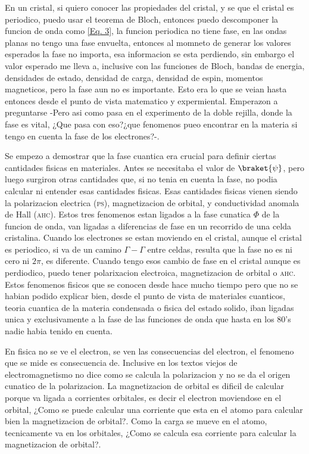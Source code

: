 \documentclass[11pt,fleqn]{book}
\begin{document}
En un cristal, si quiero conocer las propiedades del cristal, y se que el cristal es periodico, puedo usar el teorema de Bloch, entonces puedo descomponer la funcion de onda como \ref{Eq. 3}, la funcion periodica no tiene fase, en las ondas planas no tengo una fase envuelta, entonces al momneto de generar los valores esperados la fase no importa, esa informacion se esta perdiendo, sin embargo el valor esperado me lleva a, inclusive con las funciones de Bloch, bandas de energia, densidades de estado, densidad de carga, densidad de espin, momentos magneticos, pero la fase aun no es importante. Esto era lo que se veian hasta entonces desde el punto de vista matematico y expermiental. Emperazon a preguntarse -Pero asi como pasa en el experimento de la doble rejilla, donde la fase es vital, ¿Que pasa con eso?¿que fenomenos pueo encontrar en la materia si tengo en cuenta la fase de los electrones?-.

Se empezo a demostrar que la fase cuantica era crucial para definir ciertas cantidades fisicas en materiales. Antes se necesitaba el valor de $\braket{\psi}$, pero luego surgiron otras cantidades que, si no tenia en cuenta la fase, no podia calcular ni entender esas cantidades fisicas. Esas cantidades fisicas vienen siendo la polarizacion electrica (\textsc{ps}), magnetizacion de orbital, y conductividad anomala de Hall (\textsc{ahc}). Estos tres fenomenos estan ligados a la fase cunatica $\Phi$ de la funcion de onda, van ligadas a diferencias de fase en un recorrido de una celda cristalina. Cuando los  electrones se estan moviendo en el cristal, aunque el cristal es periodico, si va de un camino $\Gamma-\Gamma$ entre celdas, resulta que la fase no es ni cero ni $2\pi$, es diferente. Cuando tengo esos cambio de fase en el cristal aunque es perdiodico, puedo tener polarixacion electroica, magnetizacion de orbital o \textsc{ahc}. Estos fenomenos fisicos que se conocen desde hace mucho tiempo pero que no se habian podido explicar bien, desde el punto de vista de materiales cuanticos, teoria  cuantica de la materia condensada o fisica del estado solido, iban ligadas unica y exclusivamente a la fase de las funciones de onda que hasta en los 80's nadie habia tenido en cuenta.

En fisica no se ve el electron, se ven las consecuencias del electron, el fenomeno que se mide es consecuencia de. Inclusive en los textos viejos de electromagnetismo no dice como se calcula la polarizacion y no se da el origen cunatico de la polarizacion. La magnetizacion de orbital es dificil de calcular porque va ligada a corrientes orbitales, es decir el electron moviendose en el orbital, ¿Como se puede calcular una corriente que esta en el atomo para calcular bien la magnetizacion de orbital?. Como la carga se mueve en el atomo, tecnicamente va en los orbitales, ¿Como se calcula esa corriente para calcular la magnetizacion de orbital?.
\end{document}

